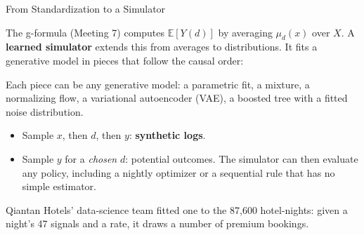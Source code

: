 \documentclass[aspectratio=169, 11pt, handout]{beamer}
\newcommand{\E}{\mathbb{E}}
\begin{document}
\begin{frame}{From Standardization to a Simulator}

The g-formula (Meeting 7) computes $\E[Y(d)]$ by averaging $\mu_d(x)$ over $X$. A \textbf{learned simulator} extends this from averages to distributions. It fits a generative model in pieces that follow the causal order:

\begin{center}
\end{center}

Each piece can be any generative model: a parametric fit, a mixture, a normalizing flow, a variational autoencoder (VAE), a boosted tree with a fitted noise distribution.

\begin{itemize}
  \item Sample $x$, then $d$, then $y$: \textbf{synthetic logs}.
  \item Sample $y$ for a \emph{chosen} $d$: potential outcomes. The simulator can then evaluate any policy, including a nightly optimizer or a sequential rule that has no simple estimator.
\end{itemize}

\medskip

Qiantan Hotels' data-science team fitted one to the 87{,}600 hotel-nights: given a night's 47 signals and a rate, it draws a number of premium bookings.
\end{frame}
\end{document}
